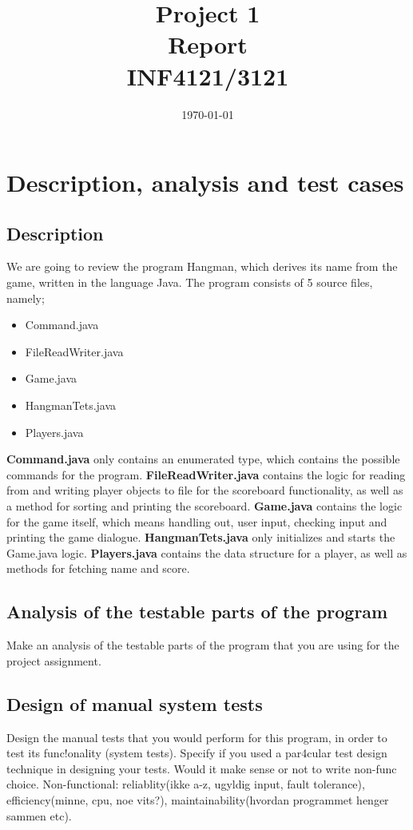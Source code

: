 \documentclass{article}
\title{Project 1 \\ Report \\ INF4121/3121} %
\date{\today} %
\begin{document}
\maketitle %

\section{Description, analysis and test cases}

\subsection{Description}
We are going to review the program Hangman, which derives its name from the game, written in the language Java. The program consists of 5 source files, namely;
\begin{itemize}
\item Command.java
\item FileReadWriter.java
\item Game.java
\item HangmanTets.java
\item Players.java
\end{itemize}

\textbf{Command.java} only contains an enumerated type, which contains the possible commands for the program. \textbf{FileReadWriter.java} contains the logic for reading from and writing player objects to file for the scoreboard functionality, as well as a method for sorting and printing the scoreboard. \textbf{Game.java} contains the logic for the game itself, which means handling out, user input, checking input and printing the game dialogue. \textbf{HangmanTets.java} only initializes and starts the Game.java logic. \textbf{Players.java} contains the data structure for a player, as well as methods for fetching name and score.

\subsection{Analysis of the testable parts of the program}
Make an analysis of the testable parts of the program that you are using for the project assignment.

\subsection{Design of manual system tests}
Design the manual tests that you would perform for this program, in order to test its func!onality
(system tests). Specify if you used a par4cular test design technique in designing your tests.
Would it make sense or not to write non-func%
choice.
Non-functional: reliablity(ikke a-z, ugyldig input, fault tolerance), efficiency(minne, cpu, noe vits?), maintainability(hvordan programmet henger sammen etc).
\end{document}
